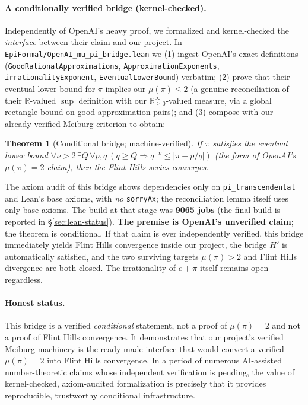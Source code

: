 \documentclass[11pt]{amsart}
\newtheorem{theorem}{Theorem}[section]
\theoremstyle{definition}
\theoremstyle{remark}
\numberwithin{equation}{section}
\newcommand{\irr}{\mu}
\begin{document}
\paragraph{A conditionally verified bridge (kernel-checked).} Independently of OpenAI's heavy proof, we formalized and kernel-checked the \emph{interface} between their claim and our project. In \texttt{EpiFormal/\allowbreak{}OpenAI\_\allowbreak{}mu\_\allowbreak{}pi\_\allowbreak{}bridge.lean} we (1) ingest OpenAI's exact definitions (\texttt{GoodRationalApproximations}, \texttt{ApproximationExponents}, \texttt{irrationalityExponent}, \texttt{EventualLowerBound}) verbatim; (2) prove that their eventual lower bound for $\pi$ implies our $\irr(\pi)\le 2$ (a genuine reconciliation of their $\mathbb R$-valued $\sup$ definition with our $\mathbb{R}_{\ge0}^\infty$-valued measure, via a global rectangle bound on good approximation pairs); and (3) compose with our already-verified Meiburg criterion to obtain:
\begin{theorem}[Conditional bridge; machine-verified]\label{thm:conditional-bridge}
If $\pi$ satisfies the eventual lower bound $\forall\nu>2\,\exists Q\,\forall p,q\ (q\ge Q\Rightarrow q^{-\nu}\le|\pi-p/q|)$ (the form of OpenAI's $\irr(\pi)=2$ claim), then the Flint Hills series converges.
\end{theorem}
The axiom audit of this bridge shows dependencies only on \texttt{pi\_transcendental} and Lean's base axioms, with \emph{no} \texttt{sorryAx}; the reconciliation lemma itself uses only base axioms. The build at that stage was \textbf{9065 jobs} (the final build is reported in \S\ref{sec:lean-status}). \textbf{The premise is OpenAI's unverified claim}; the theorem is conditional. If that claim is ever independently verified, this bridge immediately yields Flint Hills convergence inside our project, the bridge $H'$ is automatically satisfied, and the two surviving targets $\irr(\pi)>2$ and Flint Hills divergence are both closed. The irrationality of $e+\pi$ itself remains open regardless.

\paragraph{Honest status.} This bridge is a verified \emph{conditional} statement, not a proof of $\irr(\pi)=2$ and not a proof of Flint Hills convergence. It demonstrates that our project's verified Meiburg machinery is the ready-made interface that would convert a verified $\irr(\pi)=2$ into Flint Hills convergence. In a period of numerous AI-assisted number-theoretic claims whose independent verification is pending, the value of kernel-checked, axiom-audited formalization is precisely that it provides reproducible, trustworthy conditional infrastructure.
\end{document}

